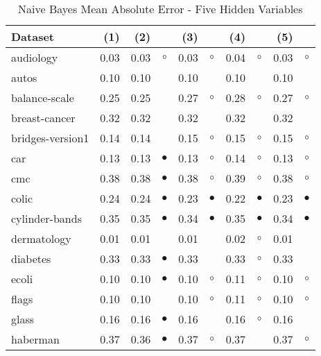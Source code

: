\newpage
{\centering \footnotesize \begin{longtable}{lrr@{\hspace{0.1cm}}cr@{\hspace{0.1cm}}cr@{\hspace{0.1cm}}cr@{\hspace{0.1cm}}c}
\caption{\label{nbmae5}Naive Bayes Mean Absolute Error - Five Hidden Variables}
\\
\hline
Dataset & (1)& (2) & & (3) & & (4) & & (5) & \\
\hline
audiology & 0.03 & 0.03 &   $\circ$ & 0.03 &    $\circ$ & 0.04 &   $\circ$ & 0.03 &    $\circ$\\
autos & 0.10 & 0.10 &           & 0.10 &            & 0.10 &           & 0.10 &           \\
balance-scale & 0.25 & 0.25 &           & 0.27 &    $\circ$ & 0.28 &   $\circ$ & 0.27 &    $\circ$\\
breast-cancer & 0.32 & 0.32 &           & 0.32 &            & 0.32 &           & 0.32 &           \\
bridges-version1 & 0.14 & 0.14 &           & 0.15 &    $\circ$ & 0.15 &   $\circ$ & 0.15 &    $\circ$\\
car & 0.13 & 0.13 & $\bullet$ & 0.13 &    $\circ$ & 0.14 &   $\circ$ & 0.13 &    $\circ$\\
cmc & 0.38 & 0.38 & $\bullet$ & 0.38 &    $\circ$ & 0.39 &   $\circ$ & 0.38 &    $\circ$\\
colic & 0.24 & 0.24 & $\bullet$ & 0.23 &  $\bullet$ & 0.22 & $\bullet$ & 0.23 &  $\bullet$\\
cylinder-bands & 0.35 & 0.35 & $\bullet$ & 0.34 &  $\bullet$ & 0.35 & $\bullet$ & 0.34 &  $\bullet$\\
dermatology & 0.01 & 0.01 &           & 0.01 &            & 0.02 &   $\circ$ & 0.01 &           \\
diabetes & 0.33 & 0.33 & $\bullet$ & 0.33 &            & 0.33 &   $\circ$ & 0.33 &           \\
ecoli & 0.10 & 0.10 & $\bullet$ & 0.10 &    $\circ$ & 0.11 &   $\circ$ & 0.10 &    $\circ$\\
flags & 0.10 & 0.10 &           & 0.10 &    $\circ$ & 0.11 &   $\circ$ & 0.10 &    $\circ$\\
glass & 0.16 & 0.16 & $\bullet$ & 0.16 &            & 0.16 &   $\circ$ & 0.16 &           \\
haberman & 0.37 & 0.36 & $\bullet$ & 0.37 &    $\circ$ & 0.37 &           & 0.37 &    $\circ$\\

\end{longtable}}
